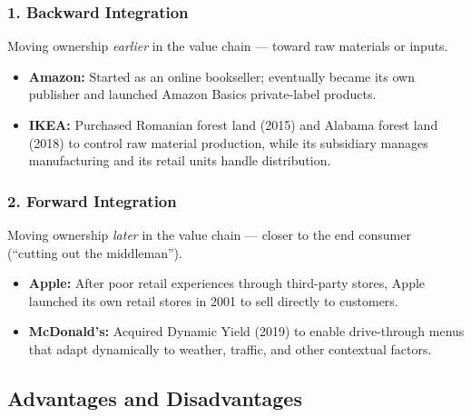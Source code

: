 \documentclass[11pt, letterpaper]{article}
\begin{document}
\subsubsection{1. Backward Integration}
Moving ownership \textit{earlier} in the value chain --- toward raw materials or inputs.

\begin{itemize}[leftmargin=*]
  \item \textbf{Amazon:} Started as an online bookseller; eventually became its own publisher and launched Amazon Basics private-label products.
  \item \textbf{IKEA:} Purchased Romanian forest land (2015) and Alabama forest land (2018) to control raw material production, while its subsidiary manages manufacturing and its retail units handle distribution.
\end{itemize}

\subsubsection{2. Forward Integration}
Moving ownership \textit{later} in the value chain --- closer to the end consumer (``cutting out the middleman'').

\begin{itemize}[leftmargin=*]
  \item \textbf{Apple:} After poor retail experiences through third-party stores, Apple launched its own retail stores in 2001 to sell directly to customers.
  \item \textbf{McDonald's:} Acquired Dynamic Yield (2019) to enable drive-through menus that adapt dynamically to weather, traffic, and other contextual factors.
\end{itemize}

\subsection{Advantages and Disadvantages}
\end{document}
